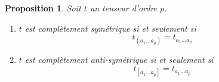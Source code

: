 \documentclass[a4paper,11pt]{report}
\theoremstyle{definition}
\theoremstyle{plain}
\newtheorem{prop}[thm]{Proposition}
\theoremstyle{definition}
\theoremstyle{remark}
\begin{document}
                \begin{prop}
                    Soit $t$ un tenseur d'ordre $p$.
                    \begin{enumerate}[label = \textit{\roman*)}]
                        \item $t$ est complètement symétrique si et seulement si
                        \begin{equation}
                            t_{(a_1\dots a_p)} = t_{a_1\dots a_p}
                        \end{equation}
                        \item $t$ est complètement anti-symétrique si et seulement si
                        \begin{equation}
                            t_{[a_1\dots a_p]} = t_{a_1\dots a_p}
                        \end{equation}
                    \end{enumerate}
                \end{prop}
                
\end{document}
